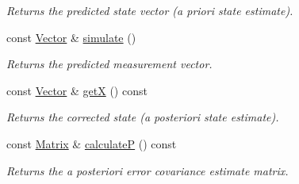 \begin{Indent}
\begin{DoxyCompactItemize}
\begin{DoxyCompactList}\small\item\em Returns the predicted state vector ({\itshape a priori} state estimate). \end{DoxyCompactList}\item 
const \mbox{\hyperlink{classKalman_1_1EKFilter_af773d1217ecb01925b857d49b32bc636}{Vector}} \& \mbox{\hyperlink{classKalman_1_1EKFilter_ae111e647e38f64bed354c85ff8f5c3ad}{simulate}} ()
\begin{DoxyCompactList}\small\item\em Returns the predicted measurement vector. \end{DoxyCompactList}\item 
\mbox{\label{classKalman_1_1EKFilter_a139a2b78cca2fdd1f8d98998608385b0}} 
const \mbox{\hyperlink{classKalman_1_1EKFilter_af773d1217ecb01925b857d49b32bc636}{Vector}} \& \mbox{\hyperlink{classKalman_1_1EKFilter_a139a2b78cca2fdd1f8d98998608385b0}{getX}} () const
\begin{DoxyCompactList}\small\item\em Returns the corrected state ({\itshape a posteriori} state estimate). \end{DoxyCompactList}\item 
const \mbox{\hyperlink{classKalman_1_1EKFilter_a7cbc4cb4d9139a7f241b27110426af43}{Matrix}} \& \mbox{\hyperlink{classKalman_1_1EKFilter_af73c892e9624013167ddecc04be01044}{calculateP}} () const
\begin{DoxyCompactList}\small\item\em Returns the {\itshape a posteriori} error covariance estimate matrix. \end{DoxyCompactList}\end{DoxyCompactItemize}
\end{Indent}
